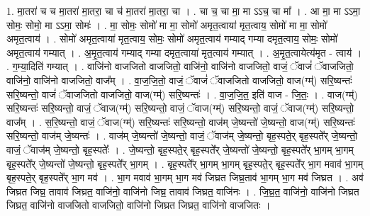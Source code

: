 \documentclass[17pt]{extarticle}
\begin{document}
1. मा॒तरा॑ च च मा॒तरा॑ मा॒तरा॒ चा च॑ मा॒तरा॑ मा॒तरा॒ चा । . चा च॒ चा मा॒ मा ऽऽच॒ चा मा᳚ । . आ मा॒ मा ऽऽमा॒ सोमः॒ सोमो॒ मा ऽऽमा॒ सोमः॑ । . मा॒ सोमः॒ सोमो॑ मा मा॒ सोमो॑ अमृत॒त्वाया॑ मृत॒त्वाय॒ सोमो॑ मा मा॒ सोमो॑ अमृत॒त्वाय॑ । . सोमो॑ अमृत॒त्वाया॑ मृत॒त्वाय॒ सोमः॒ सोमो॑ अमृत॒त्वाय॑ गम्याद् गम्या दमृत॒त्वाय॒ सोमः॒ सोमो॑ अमृत॒त्वाय॑ गम्यात् । . अ॒मृ॒त॒त्वाय॑ गम्याद् गम्या दमृत॒त्वाया॑ मृत॒त्वाय॑ गम्यात् । . अ॒मृ॒त॒त्वायेत्य॑मृत - त्वाय॑ । . ग॒म्या॒दिति॑ गम्यात् । . वाजि॑नो वाजजितो वाजजितो॒ वाजि॑नो॒ वाजि॑नो वाजजितो॒ वाजं॒ ॅवाजं॑ ॅवाजजितो॒ वाजि॑नो॒ वाजि॑नो वाजजितो॒ वाज᳚म् । . वा॒ज॒जि॒तो॒ वाजं॒ ॅवाजं॑ ॅवाजजितो वाजजितो॒ वाज(ग्म्॑) सरि॒ष्यन्तः॑ सरि॒ष्यन्तो॒ वाजं॑ ॅवाजजितो वाजजितो॒ वाज(ग्म्॑) सरि॒ष्यन्तः॑ । . वा॒ज॒जि॒त॒ इति॑ वाज - जि॒तः॒ । . वाज(ग्म्॑) सरि॒ष्यन्तः॑ सरि॒ष्यन्तो॒ वाजं॒ ॅवाज(ग्म्॑) सरि॒ष्यन्तो॒ वाजं॒ ॅवाज(ग्म्॑) सरि॒ष्यन्तो॒ वाजं॒ ॅवाज(ग्म्॑) सरि॒ष्यन्तो॒ वाज᳚म् । . स॒रि॒ष्यन्तो॒ वाजं॒ ॅवाज(ग्म्॑) सरि॒ष्यन्तः॑ सरि॒ष्यन्तो॒ वाज॑म् जे॒ष्यन्तो॑ जे॒ष्यन्तो॒ वाज(ग्म्॑) सरि॒ष्यन्तः॑ सरि॒ष्यन्तो॒ वाज॑म् जे॒ष्यन्तः॑ । . वाज॑म् जे॒ष्यन्तो॑ जे॒ष्यन्तो॒ वाजं॒ ॅवाज॑म् जे॒ष्यन्तो॒ बृह॒स्पते॒र् बृह॒स्पते᳚र् जे॒ष्यन्तो॒ वाजं॒ ॅवाज॑म् जे॒ष्यन्तो॒ बृह॒स्पतेः᳚ । . जे॒ष्यन्तो॒ बृह॒स्पते॒र् बृह॒स्पते᳚र् जे॒ष्यन्तो॑ जे॒ष्यन्तो॒ बृह॒स्पते᳚र् भा॒गम् भा॒गम् बृह॒स्पते᳚र् जे॒ष्यन्तो॑ जे॒ष्यन्तो॒ बृह॒स्पते᳚र् भा॒गम् । . बृह॒स्पते᳚र् भा॒गम् भा॒गम् बृह॒स्पते॒र् बृह॒स्पते᳚र् भा॒ग मवाव॑ भा॒गम् बृह॒स्पते॒र् बृह॒स्पते᳚र् भा॒ग मव॑ । . भा॒ग मवाव॑ भा॒गम् भा॒ग मव॑ जिघ्रत जिघ्र॒ताव॑ भा॒गम् भा॒ग मव॑ जिघ्रत । . अव॑ जिघ्रत जिघ्र॒ तावाव॑ जिघ्रत॒ वाजि॑नो॒ वाजि॑नो जिघ्र॒ तावाव॑ जिघ्रत॒ वाजि॑नः । . जि॒घ्र॒त॒ वाजि॑नो॒ वाजि॑नो जिघ्रत जिघ्रत॒ वाजि॑नो वाजजितो वाजजितो॒ वाजि॑नो जिघ्रत जिघ्रत॒ वाजि॑नो वाजजितः । \newline
\end{document}
